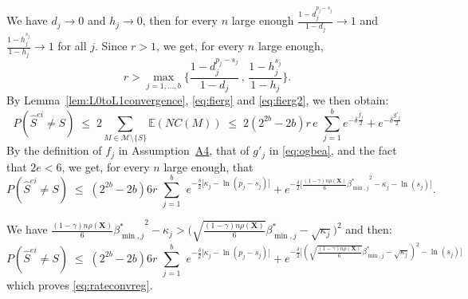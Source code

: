\documentclass[
  12pt]{article}
\newcommand{\E}{\mathbb{E}}
\newcommand{\M}{\mathcal{M}}
\newcommand{\bX}{\mathbf{X}}
\begin{document}
 We have $d_j \to 0$ and $h_j \to 0$, then for every $n$ large enough $\frac{1-d_j^{p_j-s_j}}{1-d_j}\to1$ and $\frac{1-h_j^{s_j}}{1-h_j}\to1$ for all $j$. Since $r>1$, we get, for every $n$ large enough,
\begin{equation} \label{eq:fierg2}r>\max_{j=1,\ldots,b}\bigg\{\frac{1-d_j^{p_j-s_j}}{1-d_j} \,,\,\frac{1-h_j^{s_j}}{1-h_j} \bigg\}.\end{equation} 
 By Lemma~\ref{lem:L0toL1convergence}, \eqref{eq:fierg} and \eqref{eq:fierg2}, we then obtain:
$$P(\hat{S}^{ei} \neq S)\;\leq\;  2 \sum_{M \in \M\setminus \{S\}} \E\left(NC(M)\right)
     \;\leq\; 2 (2^{2b}-2b) r\,e\,\,\sum_{j=1}^b e^{-\delta \tfrac{f_j}{2}} +e^{-\delta \tfrac{g'_j}{2}}$$
By the definition of $f_j$ in Assumption~\hyperlink{lab:A4}{A4}, that of $g'_j$ in \eqref{eq:ogbea}, and the fact that $2e<6$,  we get, for every $n$ large enough, that
\begin{equation}\label{eq:gpkr}
    P(\hat{S}^{ei} \neq S)\;\leq\; (2^{2b}-2b)6r\,\,\sum_{j=1}^b\,\, e^{-\tfrac{\delta}{2}\big[\kappa_j-\ln(p_j-s_j)\big]} + e^{-\tfrac{\delta}{2}\big[\frac{(1-\gamma) n\rho(\bX)}{6}{\beta_{\min,j}^*}^2 - \kappa_j -\ln(s_j) \big]}.
\end{equation}

We have $\frac{(1-\gamma) n\rho(\bX)}{6}{\beta_{\min,j}^*}^2 - \kappa_j > \Big(\sqrt{\frac{(1-\gamma) n\rho(\bX)}{6}}{\beta_{\min,j}^*} - \sqrt{\kappa_j}\Big)^2$ and then:
$$P(\hat{S}^{ei} \neq S)\;\leq\; (2^{2b}-2b)6r\,\,\sum_{j=1}^b\,\, e^{-\tfrac{\delta}{2}\big[\kappa_j-\ln(p_j-s_j)\big]} + e^{-\tfrac{\delta}{2}\big[(\sqrt{\frac{(1-\gamma) n\rho(\bX)}{6}}{\beta_{\min,j}^*} - \sqrt{\kappa_j})^2 -\ln(s_j) \big]}
$$
which proves \eqref{eq:rateconvreg}. 
\end{document}
